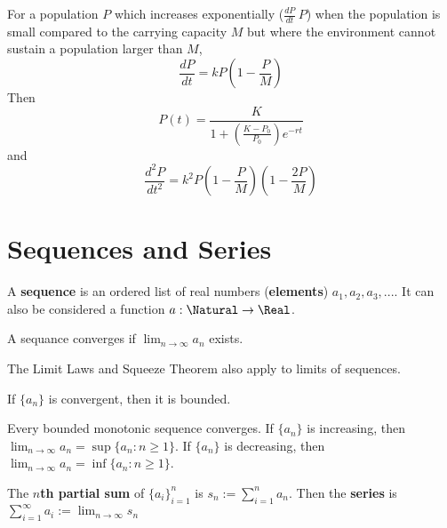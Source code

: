 \begin{definition} For a population $P$ which increases exponentially ($\frac{dP}{dt} ~ P$) when the population is small compared to the carrying capacity $M$ but where the environment cannot sustain a population larger than $M$,
  \[
    \frac{dP}{dt} = kP \left(1 - \frac{P}{M}\right)
  \]
  Then
  \[
    P(t) = \frac{K}{1 + \left(\frac{K - P_0}{P_0}\right) e^{-rt}}
  \]
  and
  \[
    \frac{d^2P}{dt^2} = k^2P \left(1 - \frac{P}{M}\right) \left(1 - \frac{2P}{M}\right)
  \]
\end{definition}

\section{Sequences and Series}

\begin{definition}[Sequence] A \textbf{sequence} is an ordered list of real numbers (\textbf{elements}) $a_1, a_2, a_3, ...$. It can also be considered a function $a: \Natural \rightarrow \Real$.
\end{definition}

\begin{definition}[Convergence] A sequance converges if $\lim_{n \to \infty} a_n$ exists.
\end{definition}

\begin{theorem} The Limit Laws and Squeeze Theorem also apply to limits of sequences.
\end{theorem}

\begin{theorem} If $\{ a_n \}$ is convergent, then it is bounded.
\end{theorem}

\begin{theorem} Every bounded monotonic sequence converges. If $\{ a_n \}$ is increasing, then $\displaystyle\lim_{n \to \infty} a_n = \sup \{ a_n : n \geq 1 \}$. If $\{ a_n \}$ is decreasing, then $\displaystyle\lim_{n \to \infty} a_n = \inf \{ a_n : n \geq 1 \}$.
\end{theorem}

\begin{definition}[Series] The \textbf{$n$th partial sum} of $\{ a_i \}_{i=1}^n$ is $s_n := \sum_{i = 1}^n a_n$. Then the \textbf{series} is $\sum_{i = 1}^\infty a_i := \lim_{n \to \infty} s_n$
\end{definition}

